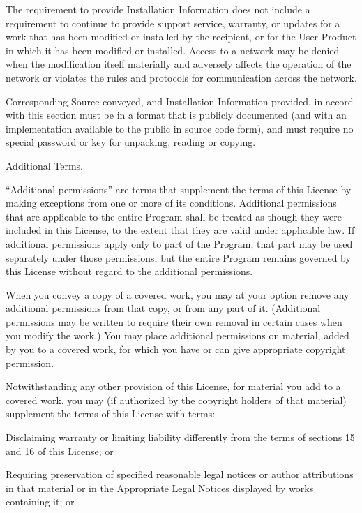 The requirement to provide Installation Information does not include a requirement to continue to provide support service, warranty, or updates for a work that has been modified or installed by the recipient, or for the User Product in which it has been modified or installed.  Access to a network may be denied when the modification itself materially and adversely affects the operation of the network or violates the rules and protocols for communication across the network.

Corresponding Source conveyed, and Installation Information provided, in accord with this section must be in a format that is publicly documented (and with an implementation available to the public in source code form), and must require no special password or key for unpacking, reading or copying.

\item Additional Terms.

``Additional permissions'' are terms that supplement the terms of this License by making exceptions from one or more of its conditions. Additional permissions that are applicable to the entire Program shall be treated as though they were included in this License, to the extent that they are valid under applicable law.  If additional permissions apply only to part of the Program, that part may be used separately under those permissions, but the entire Program remains governed by this License without regard to the additional permissions.

When you convey a copy of a covered work, you may at your option remove any additional permissions from that copy, or from any part of it.  (Additional permissions may be written to require their own removal in certain cases when you modify the work.)  You may place additional permissions on material, added by you to a covered work, for which you have or can give appropriate copyright permission.

Notwithstanding any other provision of this License, for material you add to a covered work, you may (if authorized by the copyright holders of that material) supplement the terms of this License with terms:
  \startitemize[n][]
  \item Disclaiming warranty or limiting liability differently from the terms of sections 15 and 16 of this License; or

  \item Requiring preservation of specified reasonable legal notices or author attributions in that material or in the Appropriate Legal Notices displayed by works containing it; or

